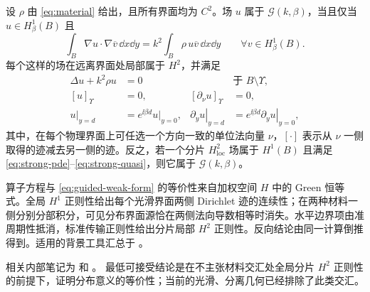 \begin{proposition}[等价的弱形式与传输形式]
\label{prop:weak-strong}
设 $\rho$ 由 \eqref{eq:material} 给出，且所有界面均为 $C^2$。场 $u$ 属于 $\mathcal G(k,\beta)$，当且仅当 $u\in H^1_\beta(B)$ 且
\begin{equation}
  \int_B\nabla u\cdot\nabla\overline v\,\dd x\dd y
  =k^2\int_B\rho\,u\overline v\,\dd x\dd y
  \qquad\forall v\in H^1_\beta(B).
  \label{eq:guided-weak-form}
\end{equation}
每个这样的场在远离界面处局部属于 $H^2$，并满足
\begin{align}
  \Delta u+k^2\rho u&=0&&\text{于 }B\setminus\Upsilon,\label{eq:strong-pde}\\
  [u]_{\Upsilon}&=0,&[\partial_\nu u]_{\Upsilon}&=0,\label{eq:TM-jumps}\\
  \left.u\right|_{y=d}
    &=e^{\ii\beta d}\left.u\right|_{y=0},&
  \left.\partial_yu\right|_{y=d}
    &=e^{\ii\beta d}\left.\partial_yu\right|_{y=0},
    \label{eq:strong-quasi}
\end{align}
其中，在每个物理界面上可任选一个方向一致的单位法向量 $\nu$，$[\cdot]$ 表示从 $\nu$ 一侧取得的迹减去另一侧的迹。反之，若一个分片 $H^2_{\mathrm{loc}}$ 场属于 $H^1(B)$ 且满足 \eqref{eq:strong-pde}--\eqref{eq:strong-quasi}，则它属于 $\mathcal G(k,\beta)$。
\end{proposition}
\begin{proofroadmap}
算子方程与 \eqref{eq:guided-weak-form} 的等价性来自加权空间 $H$ 中的 Green 恒等式。全局 $H^1$ 正则性给出每个光滑界面两侧 Dirichlet 迹的连续性；在两种材料一侧分别分部积分，可见分布界面源恰在两侧法向导数相等时消失。水平边界项由准周期性抵消，标准传输正则性给出分片局部 $H^2$ 正则性。反向结论由同一计算倒推得到。适用的背景工具汇总于 \cite[Chapters~3--4]{McLean2000}。

相关内部笔记为
 和
。
最低可接受结论是在不主张材料交汇处全局分片 $H^2$ 正则性的前提下，证明分布意义的等价性；当前的光滑、分离几何已经排除了此类交汇。
\end{proofroadmap}
